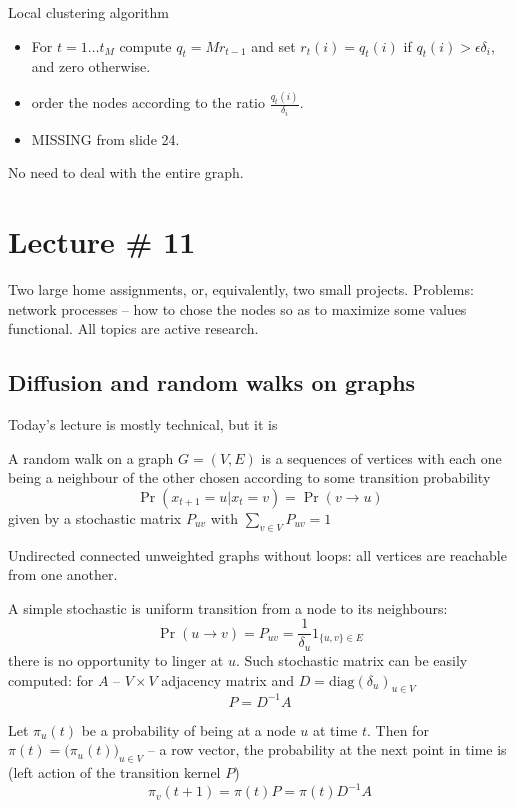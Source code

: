 \documentclass[a4paper]{article}
\begin{document}

Local clustering algorithm
\begin{itemize}
	\item For $t=1\ldots t_M$ compute $q_t = M r_{t-1}$ and set
	$r_t(i) = q_t(i)$ if $q_t(i) > \epsilon \delta_i$, and zero otherwise.
	\item order the nodes according to the ratio $\frac{q_t(i)}{\delta_i}$.
	\item MISSING from slide 24.
\end{itemize}
No need to deal with the entire graph.



\section{Lecture \# 11} %
\label{sec:lecture_11}

Two large home assignments, or, equivalently, two small projects.
Problems: network processes -- how to chose the nodes so as to maximize some
values functional.
All topics are active research.

\subsection{Diffusion and random walks on graphs} %
\label{sub:diffusion_and_random_walks_on_graphs}

Today's lecture is mostly technical, but it is

A random walk on a graph $G = (V,E)$ is a sequences of vertices with each one
being a neighbour of the other chosen according to some transition probability
\[\Pr(x_{t+1} = u \lvert x_t = v) = \Pr(v\to u)\]
given by a stochastic matrix $P_{uv}$ with $\sum_{v\in V} P_{uv} = 1$

Undirected connected unweighted graphs without loops: all vertices are
reachable from one another.

A simple stochastic is uniform transition from a node to its neighbours:
\[
\Pr(u\to v)
= P_{uv}
= \frac{1}{\delta_u} 1_{\{u,v\}\in E}
\]
there is no opportunity to linger at $u$. Such stochastic matrix can be easily
computed: for $A$ -- $V\times V$ adjacency matrix and $D = \text{diag}(\delta_u)_{u\in V}$
\[P = D^{-1} A\]

Let $\pi_u(t)$ be a probability of being at a node $u$ at time $t$. Then for
$\pi(t) = \bigl(\pi_u(t)\bigr)_{u\in V}$ -- a row vector, the probability at the next point in
time is (left action of the transition kernel $P$)
\[
\pi_v(t+1)
= \pi(t) P
= \pi(t) D^{-1} A
\]
\end{document}
